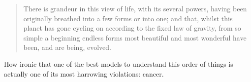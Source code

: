 




\begin{quotation}
  There is grandeur in this view of life, with its several powers, having been
  originally breathed
  into a few forms or into one; and that, whilst this planet has gone cycling on
  according to the fixed law of gravity, from so simple a beginning endless
  forms most beautiful and most wonderful have been, and are being, evolved.
\end{quotation}

How ironic that one of the best models to understand this order of things is
actually one of its most harrowing violations: cancer.

\clearpage

